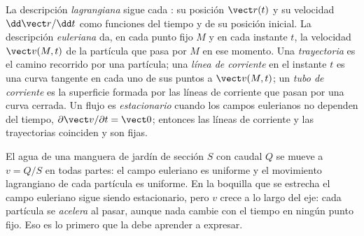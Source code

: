 \begin{definition}\label{def:b2:fluid-kinematics:euler}
La descripción \emph{lagrangiana} sigue cada : su
posición $\vect r(t)$ y su velocidad $\dd\vect r/\dd t$ como funciones del
tiempo y de su posición inicial. La descripción \emph{euleriana} da, en
cada punto fijo $M$ y en cada instante $t$, la velocidad $\vect v(M, t)$ de
la partícula que pasa por $M$ en ese momento. Una \emph{trayectoria} es el
camino recorrido por una partícula; una \emph{línea de corriente} en el
instante $t$ es una curva tangente en cada uno de sus puntos a
$\vect v(M, t)$; un \emph{tubo de corriente} es la superficie formada por
las líneas de corriente que pasan por una curva cerrada. Un flujo es
\emph{estacionario} cuando los campos eulerianos no dependen del tiempo,
$\partial\vect v/\partial t = \vect 0$; entonces las líneas de corriente y las
trayectorias coinciden y son fijas.
\end{definition}

\begin{example}\label{ex:b2:fluid-kinematics:hose}
El agua de una manguera de jardín de sección $S$ con caudal $Q$ se mueve a
$v = Q/S$ en todas partes: el campo euleriano es uniforme y el movimiento
lagrangiano de cada partícula es uniforme. En la boquilla que se estrecha
el campo euleriano sigue siendo estacionario, pero $v$ crece a lo largo
del eje: cada partícula se \emph{acelera} al pasar, aunque nada cambie con
el tiempo en ningún punto fijo. Eso es lo primero que la  debe aprender a expresar.
\end{example}

